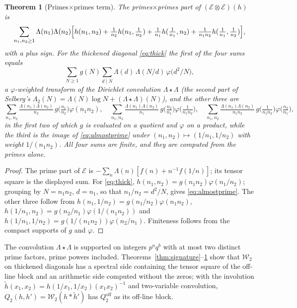 \documentclass[11pt]{amsart}
\newtheorem{theorem}{Theorem}[section]
\theoremstyle{definition}
\theoremstyle{remark}
\newcommand{\Wtwo}{\mathcal{W}_2}
\newcommand{\Ecal}{\mathcal{E}}
\newcommand{\La}{\Lambda}
\begin{document}
\begin{theorem}[Primes$\times$primes term]\label{thm:almostprime}
The primes$\times$primes part of $(\Ecal\otimes\Ecal)(h)$ is
\[
\sum_{n_1,n_2\ge1}\La(n_1)\La(n_2)\Bigl[h(n_1,n_2)+\tfrac{1}{n_2}h(n_1,\tfrac1{n_2})
+\tfrac1{n_1}h(\tfrac1{n_1},n_2)+\tfrac{1}{n_1n_2}h(\tfrac1{n_1},\tfrac1{n_2})\Bigr],
\]
with a plus sign. For the thickened diagonal \eqref{eq:thick} the first of the four sums equals
\begin{equation}\label{eq:almostprime}
\sum_{N\ge1} g(N)\sum_{d\mid N}\La(d)\,\La(N/d)\,\varphi\!\bigl(d^2/N\bigr),
\end{equation}
a $\varphi$-weighted transform of the Dirichlet convolution $\La\star\La$ (the second part of
Selberg's $\La_2(N)=\La(N)\log N+(\La\star\La)(N)$), and the other three are
\[
\sum_{n_1,n_2}\tfrac{\La(n_1)\La(n_2)}{n_2}\,g\bigl(\tfrac{n_1}{n_2}\bigr)\varphi(n_1n_2),\quad
\sum_{n_1,n_2}\tfrac{\La(n_1)\La(n_2)}{n_1}\,g\bigl(\tfrac{n_2}{n_1}\bigr)\varphi\bigl(\tfrac1{n_1n_2}\bigr),\quad
\sum_{n_1,n_2}\tfrac{\La(n_1)\La(n_2)}{n_1n_2}\,g\bigl(\tfrac1{n_1n_2}\bigr)\varphi\bigl(\tfrac{n_2}{n_1}\bigr),
\]
in the first two of which $g$ is evaluated on a quotient and $\varphi$ on a product, while the
third is the image of \eqref{eq:almostprime} under $(n_1,n_2)\mapsto(1/n_1,1/n_2)$ with weight
$1/(n_1n_2)$. All four sums are finite, and they
are computed from the primes alone.
\end{theorem}

\begin{proof}
The prime part of $\Ecal$ is $-\sum_n\La(n)[f(n)+n^{-1}f(1/n)]$; its tensor square is the
displayed sum. For \eqref{eq:thick}, $h(n_1,n_2)=g(n_1n_2)\varphi(n_1/n_2)$; grouping by
$N=n_1n_2$, $d=n_1$, so that $n_1/n_2=d^2/N$, gives \eqref{eq:almostprime}. The other three
follow from $h(n_1,1/n_2)=g(n_1/n_2)\varphi(n_1n_2)$, $h(1/n_1,n_2)=g(n_2/n_1)\varphi(1/(n_1n_2))$
and $h(1/n_1,1/n_2)=g(1/(n_1n_2))\varphi(n_2/n_1)$. Finiteness follows from the compact supports
of $g$ and $\varphi$.
\end{proof}

The convolution $\La\star\La$ is supported on integers $p^aq^b$ with at most two distinct prime
factors, prime powers included. Theorems~\ref{thm:signature}--\ref{thm:almostprime} show that
$\Wtwo$ on thickened diagonals has a spectral side containing the tensor square of the
off-line block and an arithmetic side computed without the zeros; with the involution
$\tilde h(x_1,x_2)=\overline{h(1/x_1,1/x_2)}(x_1x_2)^{-1}$ and two-variable convolution,
$Q_2(h,h')=\Wtwo(h*\tilde h')$ has $Q_2^{\mathrm{off}}$ as its off-line block.
\end{document}
